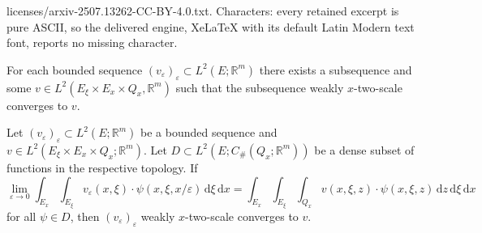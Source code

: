 \documentclass[10pt,a4paper]{amsart}
\newcommand{\R}{\mathbb{R}}
\newcommand{\dd}{\,\mathrm{d}}
\renewcommand{\epsilon}{\varepsilon}
\newcommand{\sequence}[2]{(#1_#2)_{#2}}
\newcommand{\veps}{\varepsilon}
\begin{document}
licenses/arxiv-2507.13262-CC-BY-4.0.txt. Characters: every retained excerpt is pure ASCII, so the delivered engine, XeLaTeX with its default Latin Modern text font, reports no missing character.
\begin{lemma}\label{lem:xts_comp}
    For each bounded sequence \(\sequence{v}{\veps}\subset L^2(E;\R^m)\) there exists a subsequence and some \(v\in L^2(E_\xi\times E_x\times Q_x,\R^m)\) such that the subsequence weakly \(x\)-two-scale converges to \(v\).
\end{lemma}

\begin{lemma}\label{lem:x_ts_approx}
    Let \(\sequence{v}{\veps}\subset L^2(E;\R^m)\) be a bounded sequence and \(v\in L^2(E_\xi\times E_x\times Q_x;\R^m)\). Let \(D\subset L^2(E;C_{\#}(Q_x;\R^m))\) be a dense subset of functions in the respective topology. If 
    \begin{equation}\label{eq:x_ts_approx}
    \lim_{\veps \to 0}\int_{E_x}\int_{E_\xi} v_\epsilon(x,\xi) \cdot \psi(x,\xi,x/\epsilon)\dd \xi\dd x 
    = \int_{E_x}\int_{E_\xi}\int_{Q_x}v(x,\xi,z) \cdot \psi(x,\xi,z)\dd z\dd \xi \dd x
    \end{equation}
    for all \(\psi\in D\), then \(\sequence{v}{\veps}\) weakly \(x\)-two-scale converges to \(v\).
\end{lemma}
\end{document}
